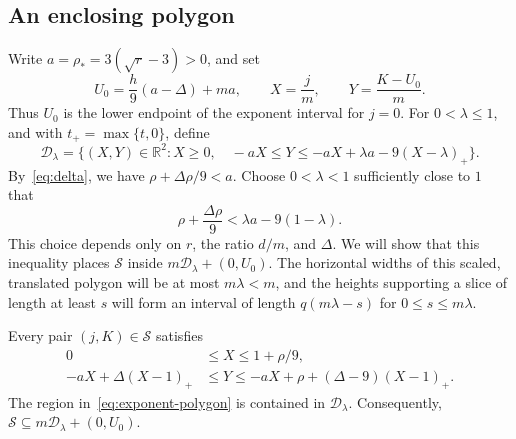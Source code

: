 \subsection{An enclosing polygon}

Write $a=\rho_*=3(\sqrt r-3)>0$, and set
\[
 U_0=\frac h9(a-\Delta)+ma,
 \qquad X=\frac jm,\qquad Y=\frac{K-U_0}{m}.
\]
Thus $U_0$ is the lower endpoint of the exponent interval for $j=0$. For $0<\lambda\le1$, and with $t_+=\max\{t,0\}$, define
\begin{equation}\label{eq:enclosing-polygon}
 \mathcal{D}_\lambda
 =\bigl\{(X,Y)\in\mathbb{R}^2:
 X\ge0,\quad
 -aX\le Y\le-aX+\lambda a-9(X-\lambda)_+\bigr\}.
\end{equation}
By~\eqref{eq:delta}, we have $\rho+\Delta\rho/9<a$. Choose $0<\lambda<1$ sufficiently close to $1$ that
\begin{equation}\label{eq:lambda}
 \rho+\frac{\Delta\rho}{9}<\lambda a-9(1-\lambda).
\end{equation}
This choice depends only on $r$, the ratio $d/m$, and $\Delta$. We will show that this inequality places $\mathcal{S}$ inside $m\mathcal{D}_\lambda+(0,U_0)$. The horizontal widths of this scaled, translated polygon will be at most $m\lambda<m$, and the heights supporting a slice of length at least $s$ will form an interval of length $q(m\lambda-s)$ for $0\le s\le m\lambda$.

\begin{lemma}\label{lem:exponent-enclosure}
Every pair $(j,K)\in\mathcal{S}$ satisfies
\begin{equation}\label{eq:exponent-polygon}
 \begin{aligned}
 0&\le X\le1+\rho/9,\\
 -aX+\Delta(X-1)_+
 &\le Y\le-aX+\rho+(\Delta-9)(X-1)_+.
 \end{aligned}
\end{equation}
The region in~\eqref{eq:exponent-polygon} is contained in $\mathcal{D}_\lambda$. Consequently, $\mathcal{S}\subseteq m\mathcal{D}_\lambda+(0,U_0)$.
\end{lemma}

